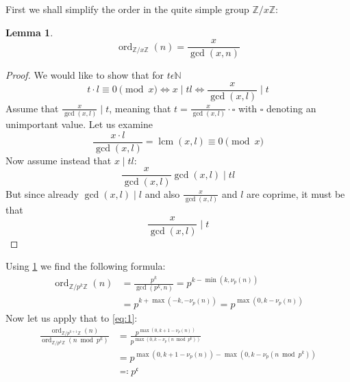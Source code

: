\documentclass{article}
\newcommand{\ordadd}[1]{\ord_{ℤ/{#1}ℤ}}
\newcommand{\frakc}{\mathfrak{c}}
\DeclareMathOperator{\ord}{ord}
\DeclareMathOperator{\lcm}{lcm}
\newenvironment{pg}{

}{\medskip}
\newtheorem{lemma}{Lemma}
\begin{document}
	\begin{pg}
		First we shall simplify the order in the quite simple group $ℤ/xℤ$:
		\begin{lemma}\label{lemma:1}
			\begin{equation*}
				\ordadd{x}(n) = \frac{x}{\gcd(x, n)}
			\end{equation*}
		\end{lemma}
		\begin{proof}
			We would like to show that for $t ϵ  ℕ$
			\begin{equation*}
				t · l \equiv 0 \pmod x ⇔ x \mid tl ⇔ \frac{x}{\gcd(x, l)} \mid t
			\end{equation*}
			Assume that $\frac{x}{\gcd(x, l)} \mid t$, meaning that $t = \frac{x}{\gcd(x, l)} · \square$ with $\square$ denoting an unimportant value.
			Let us examine
			\begin{equation*}
				\frac{x · l}{\gcd(x, l)} = \lcm(x, l) \equiv 0 \pmod{x}
			\end{equation*}
			Now assume instead that $x \mid tl$:
			\begin{equation*}
				\frac{x}{\gcd(x, l)} \gcd(x, l) \mid tl
			\end{equation*}
			But since already $\gcd(x, l) \mid l$ and also $\frac{x}{\gcd(x, l)}$ and $l$ are coprime, it must be that
			\begin{equation*}
				\frac{x}{\gcd(x, l)} \mid t
			\end{equation*}
		\end{proof}
	\end{pg}
	\begin{pg}
		Using \cref{lemma:1} we find the following formula:
		\begin{equation*}
			\begin{split}
				\ordadd{p^k}(n) &= \frac{p^k}{\gcd(p^k,n)} = p^{k - \min(k, ν_p(n))} \\
				&= p^{k + \max(-k, -ν_p(n))} = p^{\max(0, k-ν_p(n))}
			\end{split}
		\end{equation*}
		Now let us apply that to \cref{eq:1}:
		\begin{equation*}
			\begin{split}
				\frac{\ordadd{p^{k+1}}(n)}{\ordadd{p^k}(n \bmod p^k)} 
				&=
				\frac{p^{\max(0, k+1-ν_p(n))}}
				{p^{\max(0, k-ν_p(n \bmod p^k))}} \\
				&=
				p^{\max(0, k+1-ν_p(n)) - \max(0,k-ν_p(n \bmod p^k))} \\
				&\eqcolon p^\frakc
			\end{split}
		\end{equation*}
	\end{pg}
\end{document}
